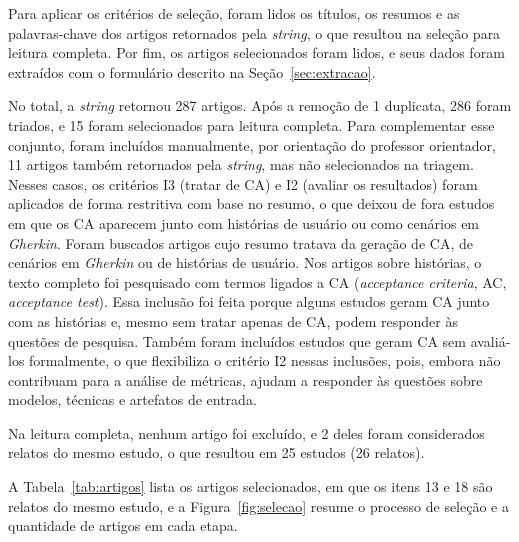 Para aplicar os critérios de seleção, foram lidos os títulos, os resumos e as palavras-chave dos artigos retornados pela \textit{string}, o que resultou na seleção para leitura completa. Por fim, os artigos selecionados foram lidos, e seus dados foram extraídos com o formulário descrito na Seção~\ref{sec:extracao}.

No total, a \textit{string} retornou 287 artigos. Após a remoção de 1 duplicata, 286 foram triados, e 15 foram selecionados para leitura completa. Para complementar esse conjunto, foram incluídos manualmente, por orientação do professor orientador, 11 artigos também retornados pela \textit{string}, mas não selecionados na triagem. Nesses casos, os critérios I3 (tratar de CA) e I2 (avaliar os resultados) foram aplicados de forma restritiva com base no resumo, o que deixou de fora estudos em que os CA aparecem junto com histórias de usuário ou como cenários em \textit{Gherkin}. Foram buscados artigos cujo resumo tratava da geração de CA, de cenários em \textit{Gherkin} ou de histórias de usuário. Nos artigos sobre histórias, o texto completo foi pesquisado com termos ligados a CA (\textit{acceptance criteria}, AC, \textit{acceptance test}). Essa inclusão foi feita porque alguns estudos geram CA junto com as histórias e, mesmo sem tratar apenas de CA, podem responder às questões de pesquisa. Também foram incluídos estudos que geram CA sem avaliá-los formalmente, o que flexibiliza o critério I2 nessas inclusões, pois, embora não contribuam para a análise de métricas, ajudam a responder às questões sobre modelos, técnicas e artefatos de entrada.

Na leitura completa, nenhum artigo foi excluído, e 2 deles foram considerados relatos do mesmo estudo, o que resultou em 25 estudos (26 relatos).

A Tabela~\ref{tab:artigos} lista os artigos selecionados, em que os itens 13 e 18 são relatos do mesmo estudo, e a Figura~\ref{fig:selecao} resume o processo de seleção e a quantidade de artigos em cada etapa.

